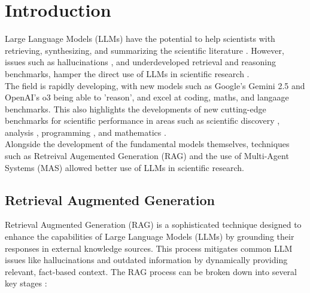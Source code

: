 \section{Introduction}
\label{sec:introduction}

Large Language Models (LLMs) have the potential to help scientists with retrieving, synthesizing, and summarizing the scientific literature \cite{skarlinski_language_2024}. 
However, issues such as hallucinations \cite{xu_hallucination_2025}, and underdeveloped retrieval and reasoning benchmarks, hamper the direct use of LLMs in scientific research . \\

The field is rapidly developing, with new models such as Google's Gemini 2.5 \cite{noauthor_gemini_2025} and OpenAI's o3 \cite{knight_openai_nodate} being able to 'reason', and excel at coding, maths, and langaage benchmarks. 
This also highlights the developments of new cutting-edge benchmarks for scientific performance in areas such as scientific discovery \cite{shojaee_llm-srbench_2025}, analysis \cite{cai_sciassess_2024}, programming \cite{quan_codeelo_2025} \cite{openai_competitive_2025}, and mathematics \cite{liu_mathbench_2024}. \\

Alongside the development of the fundamental models themselves, techniques such as Retreival Augemented Generation (RAG) and the use of Multi-Agent Systems (MAS) allowed better use of LLMs in scientific research. \\

\subsection{Retrieval Augmented Generation}
Retrieval Augmented Generation (RAG) is a sophisticated technique designed to enhance the capabilities of Large Language Models (LLMs) by grounding their responses in external knowledge sources. This process mitigates common LLM issues like hallucinations and outdated information by dynamically providing relevant, fact-based context. The RAG process can be broken down into several key stages \cite{gupta_comprehensive_2024}:

